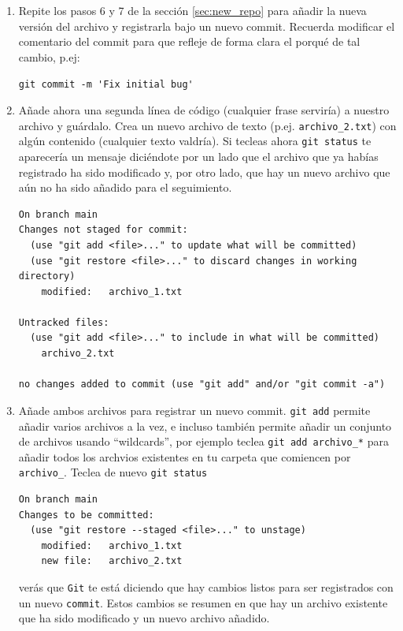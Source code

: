\documentclass[a4paper,11pt]{report}
\newcommand{\cverb}{\Verb}
\begin{document}
\begin{enumerate}
    \item Repite los pasos 6 y 7 de la sección \ref{sec:new_repo} para añadir la nueva versión del archivo y registrarla bajo un nuevo commit. Recuerda modificar el comentario del commit para que refleje de forma clara el porqué de tal cambio, p.ej: 
    
    \cverb+git commit -m 'Fix initial bug'+
    
    \item Añade ahora una segunda línea de código (cualquier frase serviría) a nuestro archivo y guárdalo. Crea un nuevo archivo de texto (p.ej. \verb+archivo_2.txt+) con algún contenido (cualquier texto valdría). Si tecleas ahora \cverb+git status+ te aparecería un mensaje diciéndote por un lado que el archivo que ya habías registrado ha sido modificado y, por otro lado, que hay un nuevo archivo que aún no ha sido añadido para el seguimiento.
    
    \begin{lstlisting}[style=custom]
On branch main
Changes not staged for commit:
  (use "git add <file>..." to update what will be committed)
  (use "git restore <file>..." to discard changes in working directory)
	modified:   archivo_1.txt

Untracked files:
  (use "git add <file>..." to include in what will be committed)
	archivo_2.txt

no changes added to commit (use "git add" and/or "git commit -a")
    \end{lstlisting}
    
    \item Añade ambos archivos para registrar un nuevo commit.  \cverb+git add+ permite añadir varios archivos a la vez, e incluso también permite añadir un conjunto de archivos usando ``wildcards'', por ejemplo teclea \cverb+git add archivo_*+ para añadir todos los archvios existentes en tu carpeta que comiencen por \verb+archivo_+. Teclea de nuevo \cverb+git status+
    
    \begin{lstlisting}[style=custom]
On branch main
Changes to be committed:
  (use "git restore --staged <file>..." to unstage)
	modified:   archivo_1.txt
	new file:   archivo_2.txt
    \end{lstlisting}    
    verás que \verb+Git+ te está diciendo que hay cambios listos para ser registrados con un nuevo \verb+commit+. Estos cambios se resumen en que hay un archivo existente que ha sido modificado y un nuevo archivo añadido.
    

\end{enumerate}
\end{document}
